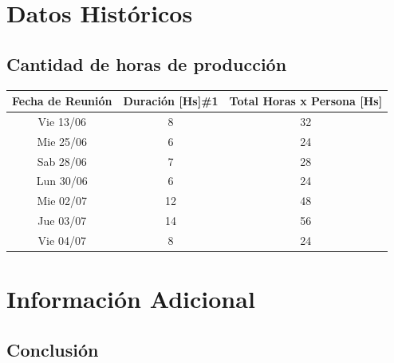 \documentclass[10pt]{article} %
\begin{document}
\section{Datos Históricos}
\subsection{Cantidad de horas de producción}
\begin{center}
\begin{tabular}{c c c}
\hline\hline %
Fecha de Reunión & Duración [Hs]\#1 & Total Horas x Persona [Hs] \\ [0.5ex] %
\hline %
Vie 13/06 & 8 & 32 \\ %
Mie 25/06 & 6 & 24 \\
Sab 28/06 & 7 & 28 \\
Lun 30/06 & 6 & 24 \\
Mie 02/07 & 12 & 48 \\
Jue 03/07 & 14 & 56 \\
Vie 04/07 & 8 & 24 \\ [1ex] %
\hline %
\end{tabular}
\end{center}

\section{Información Adicional}


\subsection{Conclusión} %
\end{document}
